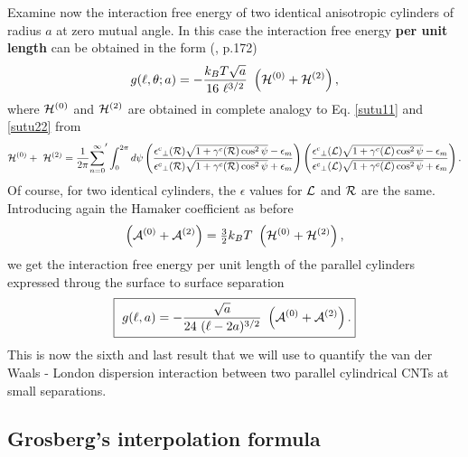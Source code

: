 \documentclass[onecolumn,letterpaper,amsmath,amssymb,floatfix,aps,superscriptaddress]{revtex4}
\begin{document}
Examine now the interaction free energy of two identical anisotropic
cylinders of radius $a$ at zero mutual angle. In this case the interaction free
energy \textbf{per unit length} can be obtained in the form 
(\cite{Parsegian}, p.172)
\begin{equation}
g(\ell,\theta;a)=-\frac{k_{B}T \sqrt{a}}{16~\ell^{3/2}}~\left({\cal H}^{(0)}+{\cal H}^{(2)}\right),\label{pop-equ25}\end{equation}
 where ${\cal H}^{(0)}$ and ${\cal H}^{(2)}$ are obtained in complete
analogy to Eq. \ref{sutu11} and \ref{sutu22} from \begin{equation}
{\cal H}^{(0)}+~{\cal H}^{(2)}=\frac{1}{2\pi}{\sum_{n=0}^{\infty}}'\int_{0}^{2\pi}d\psi\left(\frac{{{\epsilon^{c}}_{\perp}({\cal R})}\sqrt{1+{\gamma^{c}}({\cal R})\cos^{2}{\psi}}-\epsilon_{m}}{{{\epsilon^{c}}_{\perp}({\cal R})}\sqrt{1+{\gamma^{c}}({\cal R})\cos^{2}{\psi}}+\epsilon_{m}}\right)\left(\frac{{{\epsilon^{c}}_{\perp}({\cal L})}\sqrt{1+{\gamma^{c}}({\cal L})\cos^{2}{\psi}}-\epsilon_{m}}{{{\epsilon^{c}}_{\perp}({\cal L})}\sqrt{1+{\gamma^{c}}({\cal L})\cos^{2}{\psi}}+\epsilon_{m}}\right).\label{pop-stu11}\end{equation}
 Of course, for two identical cylinders, the $\epsilon$ values for ${\cal L}$ and ${\cal R}$ are the same. Introducing again the Hamaker coefficient as before 
\begin{equation}
\left({\cal A}^{(0)}+{\cal A}^{(2)}\right)={\textstyle \frac{3}{2}}k_{B}T~\left({\cal H}^{(0)}+{\cal H}^{(2)}\right),\end{equation}
we get the interaction free energy per unit length of the parallel cylinders expressed throug the surface to surface separation
 \begin{equation}
  \fbox{
    $\displaystyle{
g(\ell,a)=-\frac{\sqrt{a}}{24~(\ell - 2a)^{3/2}}~\left({\cal A}^{(0)}+{\cal A}^{(2)}\right).\label{pop-equ26}}$}
\end{equation}
 This is now the sixth and last result that we will use to quantify
the van der Waals - London dispersion interaction between two parallel
cylindrical CNTs at small separations. 

\subsection{Grosberg's interpolation formula}
\end{document}
